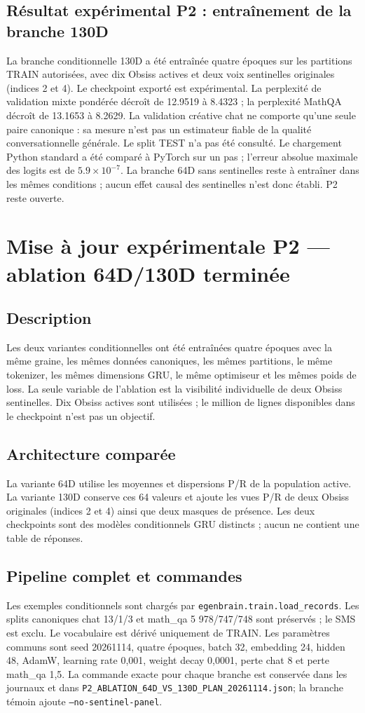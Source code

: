 \documentclass[11pt,a4paper]{report}
\begin{document}
\section{Résultat expérimental P2 : entraînement de la branche 130D}
\label{sec:p2-training-130d}
La branche conditionnelle 130D a été entraînée quatre époques sur les partitions TRAIN autorisées, avec dix Obsiss actives et deux voix sentinelles originales (indices 2 et 4). Le checkpoint exporté est expérimental. La perplexité de validation mixte pondérée décroît de 12.9519 à 8.4323 ; la perplexité MathQA décroît de 13.1653 à 8.2629. La validation créative chat ne comporte qu'une seule paire canonique : sa mesure n'est pas un estimateur fiable de la qualité conversationnelle générale. Le split TEST n'a pas été consulté. Le chargement Python standard a été comparé à PyTorch sur un pas ; l'erreur absolue maximale des logits est de $5.9\times10^{-7}$. La branche 64D sans sentinelles reste à entraîner dans les mêmes conditions ; aucun effet causal des sentinelles n'est donc établi. P2 reste ouverte.

\chapter{Mise à jour expérimentale P2 — ablation 64D/130D terminée}
\label{chap:p2-ablation-results}
\section{Description}
Les deux variantes conditionnelles ont été entraînées quatre époques avec la même graine, les mêmes données canoniques, les mêmes partitions, le même tokenizer, les mêmes dimensions GRU, le même optimiseur et les mêmes poids de loss. La seule variable de l'ablation est la visibilité individuelle de deux Obsiss sentinelles. Dix Obsiss actives sont utilisées ; le million de lignes disponibles dans le checkpoint n'est pas un objectif.
\section{Architecture comparée}
La variante 64D utilise les moyennes et dispersions P/R de la population active. La variante 130D conserve ces 64 valeurs et ajoute les vues P/R de deux Obsiss originales (indices 2 et 4) ainsi que deux masques de présence. Les deux checkpoints sont des modèles conditionnels GRU distincts ; aucun ne contient une table de réponses.
\section{Pipeline complet et commandes}
Les exemples conditionnels sont chargés par \texttt{egenbrain.train.load\_records}. Les splits canoniques chat 13/1/3 et math\_qa 5 978/747/748 sont préservés ; le SMS est exclu. Le vocabulaire est dérivé uniquement de TRAIN. Les paramètres communs sont seed 20261114, quatre époques, batch 32, embedding 24, hidden 48, AdamW, learning rate 0,001, weight decay 0,0001, perte chat 8 et perte math\_qa 1,5. La commande exacte pour chaque branche est conservée dans les journaux et dans \texttt{P2\_ABLATION\_64D\_VS\_130D\_PLAN\_20261114.json}; la branche témoin ajoute \texttt{--no-sentinel-panel}.
\end{document}
